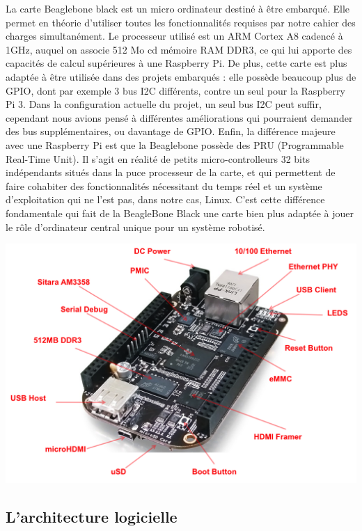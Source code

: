 \documentclass{report}
\begin{document}
     {La carte Beaglebone black est un micro ordinateur destiné à être embarqué.
     Elle permet en théorie d'utiliser toutes les fonctionnalités requises par notre
     cahier des charges simultanément. Le processeur utilisé est un ARM Cortex A8
     cadencé à 1GHz, auquel on associe 512 Mo cd mémoire RAM DDR3, ce qui lui apporte
     des capacités de calcul supérieures à une Raspberry Pi. De plus, cette carte
     est plus adaptée à être utilisée dans des projets embarqués : elle possède
     beaucoup plus de GPIO, dont par exemple 3 bus I2C différents, contre un seul
     pour la Raspberry Pi 3. Dans la configuration actuelle du projet, un seul bus I2C
     peut suffir, cependant nous avions pensé à différentes améliorations qui pourraient
     demander des bus supplémentaires, ou davantage de GPIO.
     Enfin, la différence majeure avec une Raspberry Pi est que la Beaglebone
     possède des PRU (Programmable Real-Time Unit). Il s'agit en réalité de petits
     micro-controlleurs 32 bits indépendants situés dans la puce processeur de la carte,
     et qui permettent de faire cohabiter des fonctionnalités nécessitant du temps réel et un
     système d'exploitation qui ne l'est pas, dans notre cas, Linux. C'est cette différence
     fondamentale qui fait de la BeagleBone Black une carte bien plus adaptée à jouer
     le rôle d'ordinateur central unique pour un système robotisé.}

     \begin{center}
       \includegraphics[scale=0.8]{img/black_hardware_details.png}
     \end{center}

     \subsection{L'architecture logicielle}
\end{document}
